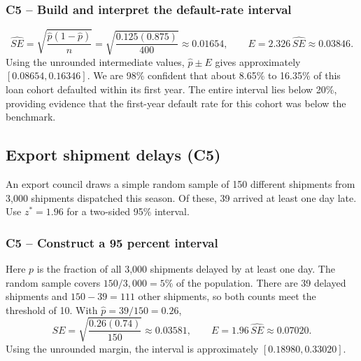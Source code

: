	\subsubsection*{C5 -- Build and interpret the default-rate interval}

	\[
	\widehat{SE}=\sqrt{\frac{\hat p(1-\hat p)}{n}}
	=\sqrt{\frac{0.125(0.875)}{400}}\approx0.01654,
	\qquad E=2.326\,\widehat{SE}\approx0.03846.
	\]
	Using the unrounded intermediate values, $\hat p\pm E$ gives approximately $[0.08654,0.16346]$. We are 98\% confident that about 8.65\% to 16.35\% of this loan cohort defaulted within its first year. The entire interval lies below 20\%, providing evidence that the first-year default rate for this cohort was below the benchmark.


	\clearpage

	\subsection{Export shipment delays (C5)}
	\label{prob:c5-2}

	An export council draws a simple random sample of 150 different shipments from 3,000 shipments dispatched this season. Of these, 39 arrived at least one day late. Use $z^*=1.96$ for a two-sided 95\% interval.


	\label{sol:c5-2-a}
	\subsubsection*{C5 -- Construct a 95 percent interval}

	Here $p$ is the fraction of all 3,000 shipments delayed by at least one day. The random sample covers $150/3{,}000=5\%$ of the population. There are 39 delayed shipments and $150-39=111$ other shipments, so both counts meet the threshold of 10. With $\hat p=39/150=0.26$,
	\[
	\widehat{SE}=\sqrt{\frac{0.26(0.74)}{150}}\approx0.03581,\qquad
	E=1.96\,\widehat{SE}\approx0.07020.
	\]
	Using the unrounded margin, the interval is approximately $[0.18980,0.33020]$.

